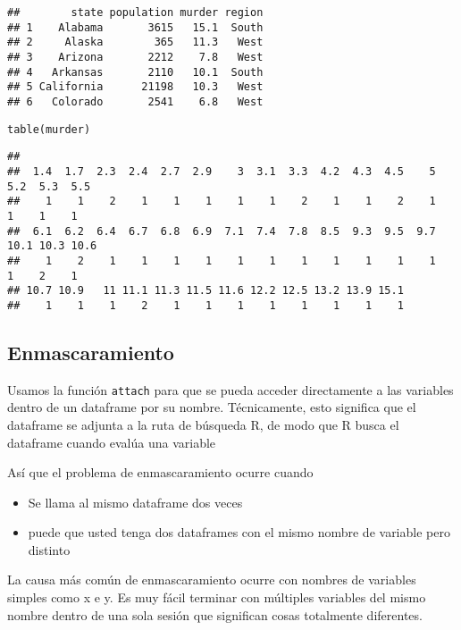\documentclass[]{article}
\newenvironment{Shaded}{\begin{snugshade}}{\end{snugshade}}
\newcommand{\KeywordTok}[1]{\textcolor[rgb]{0.13,0.29,0.53}{\textbf{#1}}}
\newcommand{\OperatorTok}[1]{\textcolor[rgb]{0.81,0.36,0.00}{\textbf{#1}}}
\newcommand{\NormalTok}[1]{#1}
\begin{document}
\begin{verbatim}
##        state population murder region
## 1    Alabama       3615   15.1  South
## 2     Alaska        365   11.3   West
## 3    Arizona       2212    7.8   West
## 4   Arkansas       2110   10.1  South
## 5 California      21198   10.3   West
## 6   Colorado       2541    6.8   West
\end{verbatim}

\begin{verbatim}
table(murder)
\end{verbatim}

\begin{Shaded}
\end{Shaded}

\begin{verbatim}
## 
##  1.4  1.7  2.3  2.4  2.7  2.9    3  3.1  3.3  4.2  4.3  4.5    5  5.2  5.3  5.5 
##    1    1    2    1    1    1    1    1    2    1    1    2    1    1    1    1 
##  6.1  6.2  6.4  6.7  6.8  6.9  7.1  7.4  7.8  8.5  9.3  9.5  9.7 10.1 10.3 10.6 
##    1    2    1    1    1    1    1    1    1    1    1    1    1    1    2    1 
## 10.7 10.9   11 11.1 11.3 11.5 11.6 12.2 12.5 13.2 13.9 15.1 
##    1    1    1    2    1    1    1    1    1    1    1    1
\end{verbatim}

\subsection{Enmascaramiento}\label{enmascaramiento}

Usamos la función \texttt{attach} para que se pueda acceder directamente
a las variables dentro de un dataframe por su nombre. Técnicamente, esto
significa que el dataframe se adjunta a la ruta de búsqueda R, de modo
que R busca el dataframe cuando evalúa una variable

Así que el problema de enmascaramiento ocurre cuando

\begin{itemize}
\item
  Se llama al mismo dataframe dos veces
\item
  puede que usted tenga dos dataframes con el mismo nombre de variable
  pero distinto
\end{itemize}

La causa más común de enmascaramiento ocurre con nombres de variables
simples como x e y. Es muy fácil terminar con múltiples variables del
mismo nombre dentro de una sola sesión que significan cosas totalmente
diferentes.
\end{document}
